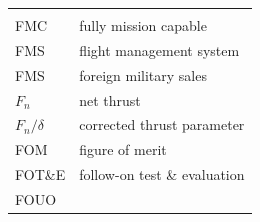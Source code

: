 \documentclass[
]{book}
\begin{document}
\begin{longtable}[]{@{}ll@{}}
\begin{minipage}[t]{0.47\columnwidth}
\end{minipage}\tabularnewline
\begin{minipage}[t]{0.47\columnwidth}\raggedright
FMC\strut
\end{minipage} & \begin{minipage}[t]{0.47\columnwidth}\raggedright
fully mission capable\strut
\end{minipage}\tabularnewline
\begin{minipage}[t]{0.47\columnwidth}\raggedright
FMS\strut
\end{minipage} & \begin{minipage}[t]{0.47\columnwidth}\raggedright
flight management system\strut
\end{minipage}\tabularnewline
\begin{minipage}[t]{0.47\columnwidth}\raggedright
FMS\strut
\end{minipage} & \begin{minipage}[t]{0.47\columnwidth}\raggedright
foreign military sales\strut
\end{minipage}\tabularnewline
\begin{minipage}[t]{0.47\columnwidth}\raggedright
\(F_n\)\strut
\end{minipage} & \begin{minipage}[t]{0.47\columnwidth}\raggedright
net thrust\strut
\end{minipage}\tabularnewline
\begin{minipage}[t]{0.47\columnwidth}\raggedright
\(F_n / \delta\)\strut
\end{minipage} & \begin{minipage}[t]{0.47\columnwidth}\raggedright
corrected thrust parameter\strut
\end{minipage}\tabularnewline
\begin{minipage}[t]{0.47\columnwidth}\raggedright
FOM\strut
\end{minipage} & \begin{minipage}[t]{0.47\columnwidth}\raggedright
figure of merit\strut
\end{minipage}\tabularnewline
\begin{minipage}[t]{0.47\columnwidth}\raggedright
FOT\&E\strut
\end{minipage} & \begin{minipage}[t]{0.47\columnwidth}\raggedright
follow-on test \& evaluation\strut
\end{minipage}\tabularnewline
\begin{minipage}[t]{0.47\columnwidth}\raggedright
FOUO\strut

\end{minipage}
\end{longtable}
\end{document}
